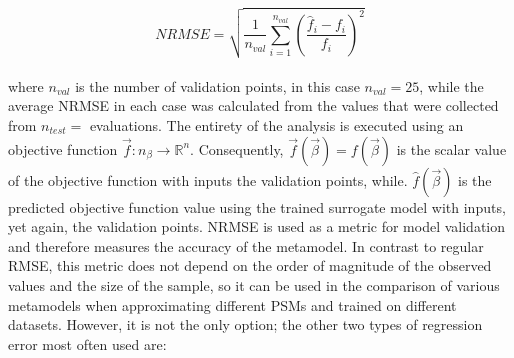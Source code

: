 \begin{equation}\label{RMSE}
NRMSE = \sqrt{ \dfrac{1}{n_{val}}\sum_{i=1}^{n_{val}} \left( 
\frac{ \hat{f}_{i} - f_{i}  }{f_{i}} \right)^2 }
\end{equation}
\\[2mm]
where $n_{val}$ is the number of validation points, in 
this case $n_{val} = 25$, while the average NRMSE in each case was 
calculated from the values that were collected from $n_{test} = 
$ evaluations. The entirety of the analysis is executed using 
an objective function $\vec{f}:n_{β} \rightarrow \mathbb{R}^{n}$. 
Consequently, $\vec{f}(\vec{β}) = f(\vec{β})$ is the scalar value 
of the objective function with inputs the validation points, while. 
$\hat{f}(\vec{β})$ is the predicted objective function value using 
the trained surrogate model with inputs, yet again, the validation 
points. NRMSE is used as a metric for model validation and 
therefore measures the accuracy of the metamodel. In contrast to 
regular RMSE, this metric does not depend on the order of 
magnitude of the observed values and the size of the sample, so 
it can be used in the comparison of various metamodels when 
approximating  different PSMs and trained on different datasets. 
However, it is not the only option; the other two types of 
regression error most often used are:

